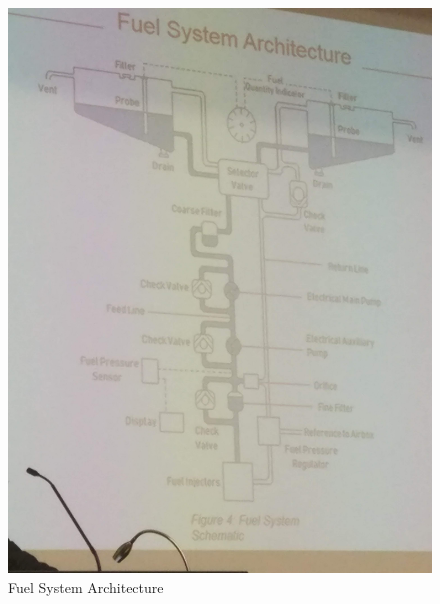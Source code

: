 \documentclass[a4paper,12pt]{article}
\begin{document}
\begin{itemize}
\begin{figure}[H]
\center
\setlength{\unitlength}{\textwidth} 
\includegraphics[width=0.9\unitlength]{1}
\caption{\label{fig:fuel} Fuel System Architecture }
\end{figure}
	

\end{itemize}
\end{document}
